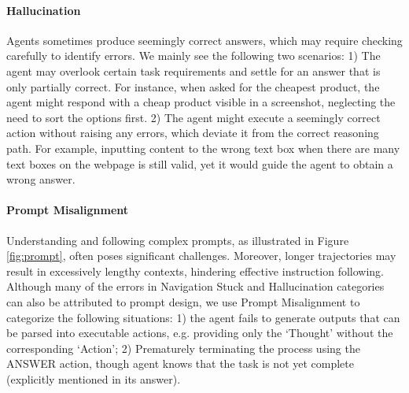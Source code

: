 \documentclass[11pt]{article}
\begin{document}
\paragraph{Hallucination} 
Agents sometimes produce seemingly correct answers, which may require checking carefully to identify errors. We mainly see the following two scenarios: 1) The agent may overlook certain task requirements and settle for an answer that is only partially correct. For instance, when asked for the cheapest product, the agent might respond with a cheap product visible in a screenshot, neglecting the need to sort the options first.
2) The agent might execute a seemingly correct action without raising any errors, which deviate it from the correct reasoning path. %
For example, inputting content to the wrong text box when there are many text boxes on the webpage is still valid, yet it would guide the agent to obtain a wrong answer.

\paragraph{Prompt Misalignment} 
Understanding and following complex prompts, as illustrated in Figure \ref{fig:prompt}, often poses significant challenges. Moreover, longer trajectories may result in excessively lengthy contexts, hindering effective instruction following. Although many of the errors in Navigation Stuck and Hallucination categories can also be attributed to prompt design, we use Prompt Misalignment to categorize the following situations: 1) the agent fails to generate outputs that can be parsed into executable actions, e.g. providing only the `Thought' without the corresponding `Action'; 2) Prematurely terminating the process using the ANSWER action, though agent knows that the task is not yet complete (explicitly mentioned in its answer). %
\end{document}
